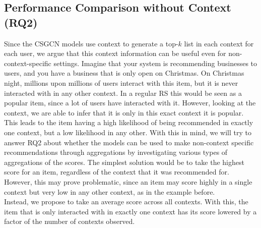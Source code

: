 \subsection{Performance Comparison without Context (RQ2)}
Since the CSGCN models use context to generate a top-$k$ list in each context for each user, we argue that this context information can be useful even for non-context-specific settings.
Imagine that your system is recommending businesses to users, and you have a business that is only open on Christmas.
On Christmas night, millions upon millions of users interact with this item, but it is never interacted with in any other context.
In a regular RS this would be seen as a popular item, since a lot of users have interacted with it.
However, looking at the context, we are able to infer that it is only in this exact context it is popular.
This leads to the item having a high likelihood of being recommended in exactly one context, but a low likelihood in any other.
With this in mind, we will try to answer RQ2 about whether the models can be used to make non-context specific recommendations through aggregations by investigating various types of aggregations of the scores.
The simplest solution would be to take the highest score for an item, regardless of the context that it was recommended for.
However, this may prove problematic, since an item may score highly in a single context but very low in any other context, as in the example before.\\
Instead, we propose to take an average score across all contexts.
With this, the item that is only interacted with in exactly one context has its score lowered by a factor of the number of contexts observed.

